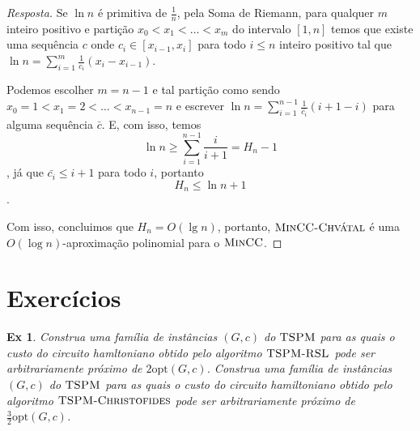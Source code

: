 \documentclass[12pt]{article}
\newcounter{exCounter}
\newtheorem{ex}[exCounter]{Ex}
\begin{document}
\begin{proof}[Resposta]
Se $\ln n$ é primitiva de $\frac{1}{n}$, pela Soma de Riemann, para qualquer $m$ inteiro positivo e partição $x_0 < x_1 < \dots < x_m$ do intervalo $[1, n]$ temos que existe uma sequência $c$ onde $c_i \in [x_{i-1}, x_i]$ para todo $i \leq n$ inteiro positivo tal que $\ln n = \sum \limits_{i=1}^m \frac{1}{c_i} (x_i - x_{i-1})$.  

Podemos escolher $m = n-1$ e tal partição como sendo $x_0 = 1 < x_1 = 2 < \dots < x_{n-1} = n$ e escrever $\ln n = \sum \limits_{i=1}^{n-1} \frac{1}{\bar{c_i}} (i + 1 - i)$ para alguma sequência $\bar{c}$. E, com isso, temos  
$$\ln n \geq \sum \limits_{i=1}^{n-1} \frac{i}{i+1} = H_n - 1$$, já que $\bar{c_i} \leq i+1$ para todo $i$, portanto
$$H_n \leq \ln n + 1$$.  

Com isso, concluimos que $H_n = O(\lg n)$, portanto, $\textsc{MinCC-Chvátal}$ é uma $O(\log n)$-aproximação polinomial para o $\textsc{MinCC}$.
\end{proof}

\section{Exercícios}
\begin{ex}
Construa uma família de instâncias $(G,c)$ do $\textsc{TSPM}$ para as quais o custo do circuito hamltoniano obtido pelo algoritmo $\textsc{TSPM-RSL}$ pode ser arbitrariamente próximo de $2\textrm{opt}(G,c)$. Construa uma família de instâncias $(G,c)$ do $\textsc{TSPM}$ para as quais o custo do circuito hamiltoniano obtido pelo algoritmo $\textsc{TSPM-Christofides}$ pode ser arbitrariamente próximo de $\frac{3}{2}\textrm{opt}(G,c)$.  
\end{ex}
\end{document}
